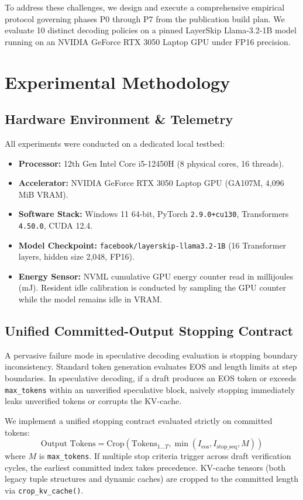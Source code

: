 \documentclass[10pt,twocolumn,letterpaper]{article}
\begin{document}
To address these challenges, we design and execute a comprehensive empirical protocol governing phases P0 through P7 from the publication build plan. We evaluate 10 distinct decoding policies on a pinned LayerSkip Llama-3.2-1B model running on an NVIDIA GeForce RTX 3050 Laptop GPU under FP16 precision.

\section{Experimental Methodology}

\subsection{Hardware Environment \& Telemetry}
All experiments were conducted on a dedicated local testbed:
\begin{itemize}
    \item \textbf{Processor:} 12th Gen Intel Core i5-12450H (8 physical cores, 16 threads).
    \item \textbf{Accelerator:} NVIDIA GeForce RTX 3050 Laptop GPU (GA107M, 4,096 MiB VRAM).
    \item \textbf{Software Stack:} Windows 11 64-bit, PyTorch \texttt{2.9.0+cu130}, Transformers \texttt{4.50.0}, CUDA 12.4.
    \item \textbf{Model Checkpoint:} \texttt{facebook/layerskip-llama3.2-1B} (16 Transformer layers, hidden size 2,048, FP16).
    \item \textbf{Energy Sensor:} NVML cumulative GPU energy counter read in millijoules (mJ). Resident idle calibration is conducted by sampling the GPU counter while the model remains idle in VRAM.
\end{itemize}

\subsection{Unified Committed-Output Stopping Contract}
A pervasive failure mode in speculative decoding evaluation is stopping boundary inconsistency. Standard token generation evaluates EOS and length limits at step boundaries. In speculative decoding, if a draft produces an EOS token or exceeds \texttt{max\_tokens} within an unverified speculative block, naively stopping immediately leaks unverified tokens or corrupts the KV-cache.

We implement a unified stopping contract evaluated strictly on committed tokens:
\begin{equation}
\text{Output Tokens} = \text{Crop}(\text{Tokens}_{1 \dots T}, \min(I_{\text{eos}}, I_{\text{stop\_seq}}, M))
\end{equation}
where $M$ is \texttt{max\_tokens}. If multiple stop criteria trigger across draft verification cycles, the earliest committed index takes precedence. KV-cache tensors (both legacy tuple structures and dynamic caches) are cropped to the committed length via \texttt{crop\_kv\_cache()}.
\end{document}

